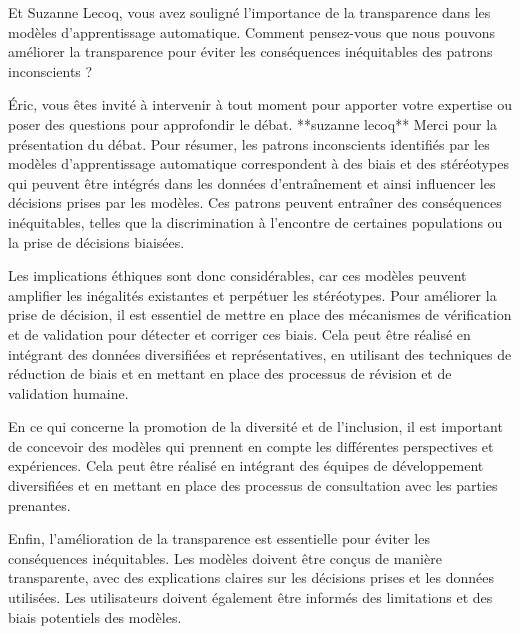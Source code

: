 Et Suzanne Lecoq, vous avez souligné l'importance de la transparence dans les modèles d'apprentissage automatique. Comment pensez-vous que nous pouvons améliorer la transparence pour éviter les conséquences inéquitables des patrons inconscients ?

Éric, vous êtes invité à intervenir à tout moment pour apporter votre expertise ou poser des questions pour approfondir le débat.
**suzanne lecoq**
Merci pour la présentation du débat. Pour résumer, les patrons inconscients identifiés par les modèles d'apprentissage automatique correspondent à des biais et des stéréotypes qui peuvent être intégrés dans les données d'entraînement et ainsi influencer les décisions prises par les modèles. Ces patrons peuvent entraîner des conséquences inéquitables, telles que la discrimination à l'encontre de certaines populations ou la prise de décisions biaisées.

Les implications éthiques sont donc considérables, car ces modèles peuvent amplifier les inégalités existantes et perpétuer les stéréotypes. Pour améliorer la prise de décision, il est essentiel de mettre en place des mécanismes de vérification et de validation pour détecter et corriger ces biais. Cela peut être réalisé en intégrant des données diversifiées et représentatives, en utilisant des techniques de réduction de biais et en mettant en place des processus de révision et de validation humaine.

En ce qui concerne la promotion de la diversité et de l'inclusion, il est important de concevoir des modèles qui prennent en compte les différentes perspectives et expériences. Cela peut être réalisé en intégrant des équipes de développement diversifiées et en mettant en place des processus de consultation avec les parties prenantes.

Enfin, l'amélioration de la transparence est essentielle pour éviter les conséquences inéquitables. Les modèles doivent être conçus de manière transparente, avec des explications claires sur les décisions prises et les données utilisées. Les utilisateurs doivent également être informés des limitations et des biais potentiels des modèles.

